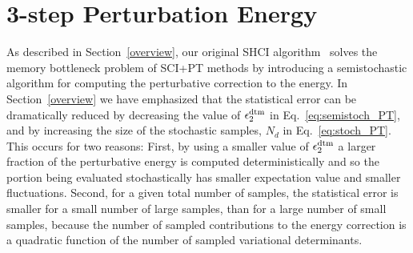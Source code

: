 \documentclass[%
reprint,
 superscriptaddress,
 amsmath,amssymb,
 aps,
]{revtex4-1}
\begin{document}
\section{3-step Perturbation Energy}
\label{multi}

As described in Section~\ref{overview}, our original SHCI algorithm~\cite{ShaHolJeaAlaUmr-JCTC-17} solves the memory bottleneck problem of SCI+PT methods
by introducing a semistochastic algorithm for computing the perturbative correction to the energy.
In Section~\ref{overview} we have emphasized that the
statistical error can be dramatically reduced
by decreasing the value of $\epsilon_2^{\rm dtm}$ in Eq.~\ref{eq:semistoch_PT}, and by increasing the size of the stochastic samples, $N_d$ in Eq.~\ref{eq:stoch_PT}.
This occurs for two reasons:
First, by using a smaller value of $\epsilon_{2} ^{\rm dtm}$ a larger fraction of the perturbative energy is computed deterministically
and so the portion being evaluated stochastically has smaller expectation value and smaller fluctuations.
Second, for a given total number of samples, the statistical error is smaller for a small number of large samples,
than for a large number of small samples, because the number of sampled contributions to the energy correction is a quadratic function
of the number of sampled variational determinants.
\end{document}
